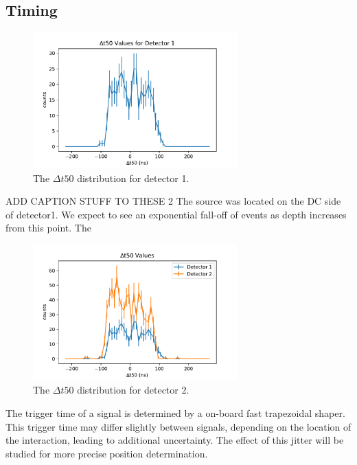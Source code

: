 \subsection{Timing}

\begin{figure}[h]
\begin{centering}
\includegraphics[width=0.7\textwidth]{./figures/t50s_det1.pdf}
\caption{The $\Delta t50$ distribution for detector 1.}
\label{t50_1}
\end{centering}
\end{figure}

ADD CAPTION STUFF TO THESE 2 The source was located on the DC side of detector1. We expect to see an exponential fall-off of events as depth increases from this point. The

\begin{figure}[h]
\begin{centering}
\includegraphics[width=0.7\textwidth]{./figures/t50s_det2.pdf}
\caption{The $\Delta t50$ distribution for detector 2.}
\label{t50_2}
\end{centering}
\end{figure}

The trigger time of a signal is determined by a on-board fast trapezoidal shaper. This trigger time may differ slightly between signals, depending on the location of the interaction, leading to additional uncertainty. The effect of this jitter will be studied for more precise position determination.

